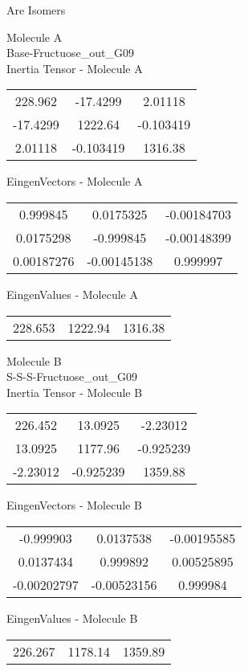 \begin{center}
\vtab
\vtab
\textcolor{NavyBlue}{\Large Are Isomers}
\end{center}
\newpage
\begin{multicols}{2}
\begin{center}
Molecule A \\ 
Base-Fructuose\_out\_G09
\\
Inertia Tensor - Molecule A \\
\vtab
\begin{tabular}{|c c c|}
228.962	 & 	-17.4299	 & 	2.01118	 \\
-17.4299	 & 	1222.64	 & 	-0.103419	 \\
2.01118	 & 	-0.103419	 & 	1316.38
\end{tabular}

\vtab
 EingenVectors - Molecule A     \\
\vtab
\begin{tabular}{|c c c|}
0.999845	 & 	0.0175325	 & 	-0.00184703	 \\
0.0175298	 & 	-0.999845	 & 	-0.00148399	 \\
0.00187276	 & 	-0.00145138	 & 	0.999997
\end{tabular}

\vtab
 EingenValues - Molecule A     \\
\vtab
\begin{tabular}{|c c c|}
228.653	 & 	1222.94	 & 	1316.38
\end{tabular}
\columnbreak

Molecule B \\ 
S-S-S-Fructuose\_out\_G09
\\
Inertia Tensor - Molecule B \\
\vtab
\begin{tabular}{|c c c|}
226.452	 & 	13.0925	 & 	-2.23012	 \\
13.0925	 & 	1177.96	 & 	-0.925239	 \\
-2.23012	 & 	-0.925239	 & 	1359.88
\end{tabular}

\vtab
 EingenVectors - Molecule B     \\
\vtab
\begin{tabular}{|c c c|}
-0.999903	 & 	0.0137538	 & 	-0.00195585	 \\
0.0137434	 & 	0.999892	 & 	0.00525895	 \\
-0.00202797	 & 	-0.00523156	 & 	0.999984
\end{tabular}

\vtab
 EingenValues - Molecule B     \\
\vtab
\begin{tabular}{|c c c|}
226.267	 & 	1178.14	 & 	1359.89
\end{tabular}

\end{center}
\end{multicols}
